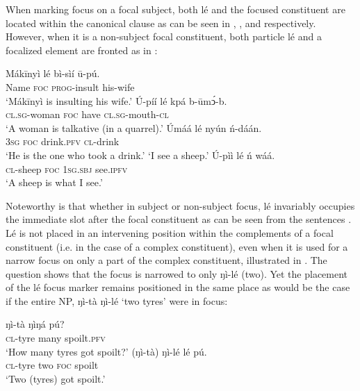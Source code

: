 \documentclass[output=paper,colorlinks,citecolor=brown]{langscibook}
\begin{document}
When marking focus on a focal subject, both lé and the focused constituent are located within the canonical clause as can be seen in , , and  respectively. However, when it is a non-subject focal constituent, both particle lé and a focalized element are fronted as in :

\ea%
    \label{ex:bisilki:22}
    \ea\label{ex:bisilki:22a}
    \gll    Mákīnyì	lé	bì-sìí	ū-pú.\\
            Name	\textsc{foc}	\textsc{prog-}insult		his-wife\\
    \glt    ‘Mákīnyì is insulting his wife.’
    \ex\label{ex:bisilki:22b}
    \gll    Ú-píí			lé	kpá	b-ūmͻ́-b.\\
            \textsc{cl.sg-}woman	\textsc{foc}	have	\textsc{cl.sg-}mouth\textsc{-cl}\\
    \glt    ‘A woman is talkative (in a quarrel).’
    \ex\label{ex:bisilki:22c}
    \gll    Úmáá		lé	nyún		ń-dáán.\\
            \textsc{3sg}		\textsc{foc}	drink\textsc{.pfv}	\textsc{cl-}drink\\
    \glt    ‘He is the one who took a drink.’
    \glt    ‘I see a sheep.’
    \ex\label{ex:bisilki:22e}
    \gll    Ú-pìì		lé	ń		wáá.\\
            \textsc{cl-}sheep	\textsc{foc}	\textsc{1sg.sbj}	see\textsc{.ipfv}\\
    \glt    ‘A sheep is what I see.’
    \z
\z

Noteworthy is that whether in subject or non-subject focus, lé invariably occupies the immediate slot after the focal constituent as can be seen from the sentences . Lé is not placed in an intervening position within the complements of a focal constituent (i.e. in the case of a complex constituent), even when it is used for a narrow focus on only a part of the complex constituent, illustrated in . The question  shows that the focus is narrowed to only ŋì-lé (two). Yet the placement of the lé focus marker  remains positioned in the same place as would be the case if the entire NP, ŋì-tà  ŋì-lé ‘two tyres’ were in focus:

\ea%
    \label{ex:bisilki:23}
    \ea\label{ex:bisilki:23a}
    \gll    ŋì-tà		ŋìŋá		pú?\\
            \textsc{cl-}tyre	many		spoilt\textsc{.pfv}\\
    \glt    ‘How many tyres got spoilt?’
    \ex\label{ex:bisilki:23b}
    \gll    (ŋì-tà)		ŋì-lé	lé	pú.\\
            \textsc{cl-}tyre	two	\textsc{foc}	spoilt\\
    \glt    ‘Two (tyres)  got spoilt.’
    \z
\z
\end{document}
